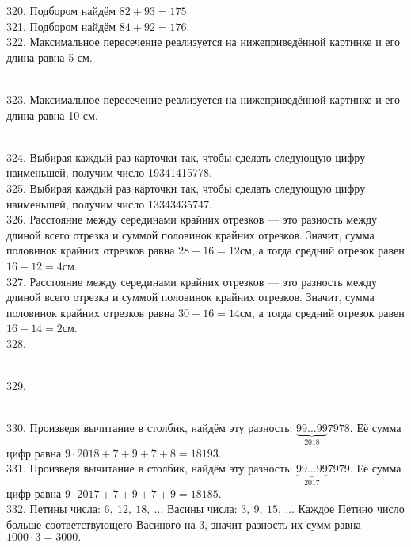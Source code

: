 320. Подбором найдём $82+93=175.$\\
321. Подбором найдём $84+92=176.$\\
322. Максимальное пересечение реализуется на нижеприведённой картинке и его длина равна 5 см.\\
\begin{figure}[ht!]
\end{figure}\\
323. Максимальное пересечение реализуется на нижеприведённой картинке и его длина равна 10 см.\\
\begin{figure}[ht!]
\end{figure}\\
324. Выбирая каждый раз карточки так, чтобы сделать следующую цифру наименьшей, получим число 19341415778.\\
325. Выбирая каждый раз карточки так, чтобы сделать следующую цифру наименьшей, получим число 13343435747.\\
326. Расстояние между серединами крайних отрезков --- это разность между длиной всего отрезка и суммой половинок крайних отрезков. Значит, сумма половинок крайних отрезков равна $28-16=12$см, а тогда средний отрезок равен $16-12=4$см.\\
327. Расстояние между серединами крайних отрезков --- это разность между длиной всего отрезка и суммой половинок крайних отрезков. Значит, сумма половинок крайних отрезков равна $30-16=14$см, а тогда средний отрезок равен $16-14=2$см.\\
328. \begin{figure}[ht!]
\end{figure}\\
329. \begin{figure}[ht!]
\end{figure}\\
330. Произведя вычитание в столбик, найдём эту разность: $\underbrace{99\ldots99}_{2018}7978.$ Её сумма цифр равна $9\cdot2018+7+9+7+8=18193.$\\
331. Произведя вычитание в столбик, найдём эту разность: $\underbrace{99\ldots99}_{2017}7979.$ Её сумма цифр равна $9\cdot2017+7+9+7+9=18185.$\\
332. Петины числа: $6,\ 12,\ 18,\ \ldots$ Васины числа: $3,\ 9,\ 15,\ \ldots$ Каждое Петино число больше соответствующего Васиного на 3, значит разность их сумм равна $1000\cdot3=3000.$\\
